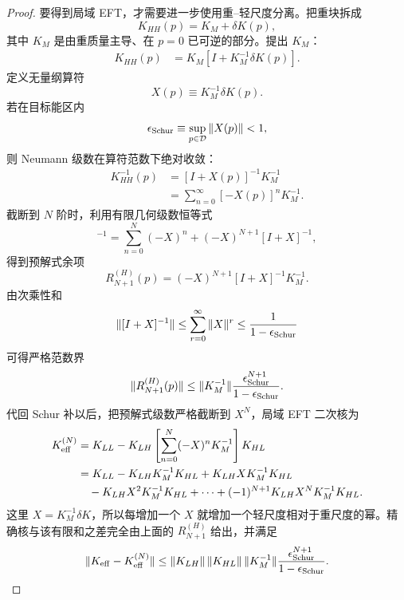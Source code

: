 \begin{proof}
要得到局域 EFT，才需要进一步使用重--轻尺度分离。把重块拆成
\begin{equation*}
 K_{HH}(p)=K_M+\delta K(p),
\end{equation*}
其中 $K_M$ 是由重质量主导、在 $p=0$ 已可逆的部分。提出 $K_M$：
\begin{align*}
 K_{HH}(p)
 &=K_M\left[I+K_M^{-1}\delta K(p)\right].
\end{align*}
定义无量纲算符
\begin{equation*}
 X(p)\equiv K_M^{-1}\delta K(p).
\end{equation*}
若在目标能区内
\begin{equation*}
 \epsilon_{\rm Schur}\equiv\sup_{p\in\mathcal D}\|X(p)\|<1,
\end{equation*}
则 Neumann 级数在算符范数下绝对收敛：
\begin{align*}
 K_{HH}^{-1}(p)
 &=[I+X(p)]^{-1}K_M^{-1}\\
 &=\sum_{n=0}^{\infty}[-X(p)]^nK_M^{-1}.
\end{align*}
截断到 $N$ 阶时，利用有限几何级数恒等式
\begin{equation*}
 [I+X]^{-1}
 =\sum_{n=0}^{N}(-X)^n
 +(-X)^{N+1}[I+X]^{-1},
\end{equation*}
得到预解式余项
\begin{equation*}
 R_{N+1}^{(H)}(p)
 =(-X)^{N+1}[I+X]^{-1}K_M^{-1}.
\end{equation*}
由次乘性和
\begin{equation*}
 \|[I+X]^{-1}\|
 \le\sum_{r=0}^{\infty}\|X\|^r
 \le\frac1{1-\epsilon_{\rm Schur}}
\end{equation*}
可得严格范数界
\begin{equation*}
 \|R_{N+1}^{(H)}(p)\|
 \le
 \|K_M^{-1}\|
 \frac{\epsilon_{\rm Schur}^{N+1}}{1-\epsilon_{\rm Schur}}.
\end{equation*}
代回 Schur 补以后，把预解式级数严格截断到 $X^N$，局域 EFT 二次核为
\begin{align*}
 K_{\rm eff}^{(N)}
 &=K_{LL}
 -K_{LH}
 \left[\sum_{n=0}^{N}(-X)^nK_M^{-1}\right]
 K_{HL}\\
 &=K_{LL}
 -K_{LH}K_M^{-1}K_{HL}
 +K_{LH}XK_M^{-1}K_{HL}\\
 &\quad-K_{LH}X^2K_M^{-1}K_{HL}
 +\cdots
 +(-1)^{N+1}K_{LH}X^NK_M^{-1}K_{HL}.
\end{align*}
这里 $X=K_M^{-1}\delta K$，所以每增加一个 $X$ 就增加一个轻尺度相对于重尺度的幂。精确核与该有限和之差完全由上面的 $R_{N+1}^{(H)}$ 给出，并满足
\begin{equation*}
 \|K_{\rm eff}-K_{\rm eff}^{(N)}\|
 \le
 \|K_{LH}\|\,\|K_{HL}\|\,
 \|K_M^{-1}\|
 \frac{\epsilon_{\rm Schur}^{N+1}}{1-\epsilon_{\rm Schur}}.
\end{equation*}


\end{proof}
